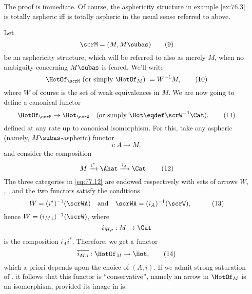 The proof is immediate. Of course, the asphericity structure in
example \ref{ex:76.3} is totally aspheric if{f} \Ahat{} is totally
aspheric in the usual sense referred to above.

\label{sec:77}%
Let
\begin{equation}
  \label{eq:77.9}
  \scrM = (M,M\subas)
  \tag{9}
\end{equation}
be an asphericity structure, which will be referred to also as merely
$M$, when no ambiguity concerning $M\subas$ is feared. We'll write
\begin{equation}
  \label{eq:77.10}
  \HotOf_\scrM \text{ (or simply $\HotOf_M$) } = W^{-1}M,
  \tag{10}
\end{equation}
where $W$ of course is the set of weak equivalences in $M$. We are now
going to define a canonical functor
\begin{equation}
  \label{eq:77.11}
  \HotOf_\scrM \to \Hot_\scrW \quad
  (\text{or simply $\Hot\eqdef\scrW^{-1}\Cat$}),
  \tag{11}
\end{equation}
defined at any rate up to canonical isomorphism. For this, take any
aspheric (namely, $M\subas$-aspheric) functor
\[ i : A\to M,\]
and consider the composition
\begin{equation}
  \label{eq:77.12}
  M \xrightarrow{i^*} \Ahat \xrightarrow{i_A} \Cat.
  \tag{12}
\end{equation}
The three categories in \eqref{eq:77.12} are endowed
respectively with sets of arrows $W$, \scrWA, \scrW, and the two
functors satisfy the conditions
\begin{equation}
  \label{eq:77.13}
  W = (i^*)^{-1}(\scrWA)\quad
  \text{and}\quad
  \scrWA=(i_A)^{-1}(\scrW),\quad
  \tag{13}
\end{equation}
hence $W=(i_{M,i})^{-1}(\scrW)$, where
\[i_{M,i} : M\to \Cat\]
is the composition $i_Ai^*$. Therefore, we get a functor
\begin{equation}
  \label{eq:77.14}
  \overline{i_{M,i}} : \HotOf_M \to \Hot,\tag{14}
\end{equation}
which a priori depends upon the choice of $(A,i)$. If we admit strong
saturation of \scrW, it follows that this functor is ``conservative'',
namely an arrow in $\HotOf_M$ is an isomorphism, provided its image in
\Hot{} is.

